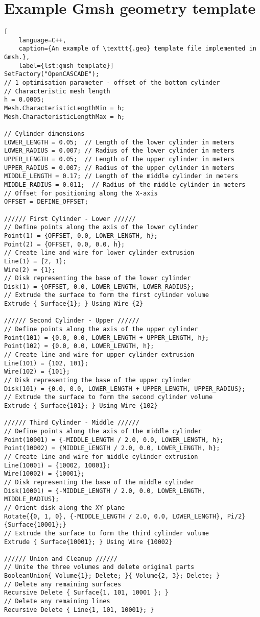 \chapter{Example Gmsh geometry template}\label{appendix A}

\begin{lstlisting}[
	language=C++,
	caption={An example of \texttt{.geo} template file implemented in Gmsh.},
	label={lst:gmsh template}]
SetFactory("OpenCASCADE");
// 1 optimisation parameter - offset of the bottom cylinder
// Characteristic mesh length
h = 0.0005;
Mesh.CharacteristicLengthMin = h;
Mesh.CharacteristicLengthMax = h;

// Cylinder dimensions
LOWER_LENGTH = 0.05;  // Length of the lower cylinder in meters
LOWER_RADIUS = 0.007; // Radius of the lower cylinder in meters
UPPER_LENGTH = 0.05;  // Length of the upper cylinder in meters
UPPER_RADIUS = 0.007; // Radius of the upper cylinder in meters
MIDDLE_LENGTH = 0.17; // Length of the middle cylinder in meters
MIDDLE_RADIUS = 0.011;  // Radius of the middle cylinder in meters
// Offset for positioning along the X-axis
OFFSET = DEFINE_OFFSET;

////// First Cylinder - Lower //////
// Define points along the axis of the lower cylinder
Point(1) = {OFFSET, 0.0, LOWER_LENGTH, h};
Point(2) = {OFFSET, 0.0, 0.0, h};
// Create line and wire for lower cylinder extrusion
Line(1) = {2, 1};
Wire(2) = {1};
// Disk representing the base of the lower cylinder
Disk(1) = {OFFSET, 0.0, LOWER_LENGTH, LOWER_RADIUS};
// Extrude the surface to form the first cylinder volume
Extrude { Surface{1}; } Using Wire {2}

////// Second Cylinder - Upper //////
// Define points along the axis of the upper cylinder
Point(101) = {0.0, 0.0, LOWER_LENGTH + UPPER_LENGTH, h};
Point(102) = {0.0, 0.0, LOWER_LENGTH, h};
// Create line and wire for upper cylinder extrusion
Line(101) = {102, 101};
Wire(102) = {101};
// Disk representing the base of the upper cylinder
Disk(101) = {0.0, 0.0, LOWER_LENGTH + UPPER_LENGTH, UPPER_RADIUS};
// Extrude the surface to form the second cylinder volume
Extrude { Surface{101}; } Using Wire {102}

////// Third Cylinder - Middle //////
// Define points along the axis of the middle cylinder
Point(10001) = {-MIDDLE_LENGTH / 2.0, 0.0, LOWER_LENGTH, h};
Point(10002) = {MIDDLE_LENGTH / 2.0, 0.0, LOWER_LENGTH, h};
// Create line and wire for middle cylinder extrusion
Line(10001) = {10002, 10001};
Wire(10002) = {10001};
// Disk representing the base of the middle cylinder
Disk(10001) = {-MIDDLE_LENGTH / 2.0, 0.0, LOWER_LENGTH, MIDDLE_RADIUS};
// Orient disk along the XY plane
Rotate{{0, 1, 0}, {-MIDDLE_LENGTH / 2.0, 0.0, LOWER_LENGTH}, Pi/2}{Surface{10001};}
// Extrude the surface to form the third cylinder volume
Extrude { Surface{10001}; } Using Wire {10002}

////// Union and Cleanup //////
// Unite the three volumes and delete original parts
BooleanUnion{ Volume{1}; Delete; }{ Volume{2, 3}; Delete; }
// Delete any remaining surfaces
Recursive Delete { Surface{1, 101, 10001 }; }
// Delete any remaining lines
Recursive Delete { Line{1, 101, 10001}; }
\end{lstlisting}
